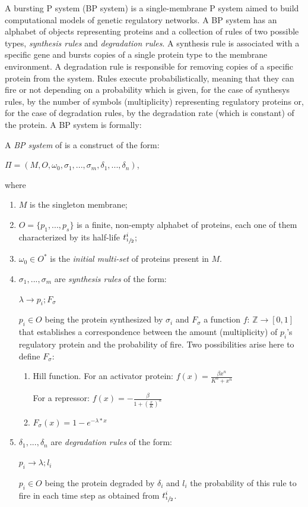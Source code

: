 \documentclass[runningheads,a4paper]{llncs}
\begin{document}
A bursting P system (BP system) is a single-membrane P system aimed to build computational models of genetic regulatory networks. A BP system has an alphabet of objects representing proteins and a collection of rules of two possible types, \emph{synthesis rules} and \emph{degradation rules}. A synthesis rule is associated with a specific gene and bursts copies of a single protein type to the membrane environment. A degradation rule is responsible for removing copies of a specific protein from the system. Rules execute probabilistically, meaning that they can fire or not depending on a probability which is given, for the case of synthesys rules, by the number of symbols (multiplicity) representing regulatory proteins or, for the case of degradation rules, by the degradation rate (which is constant) of the protein. A BP system is formally:

A \emph{BP system} of is a construct of the form:
\begin{center} $\Pi = ( M, O,\omega_{0} ,\sigma_1, ..., \sigma_m, \delta_1, ..., \delta_n)$,\end{center}
where
\begin{enumerate}
\item $M$ is the singleton membrane;
\item $O=\{p_1, ..., p_s \}$ is a finite, non-empty alphabet of proteins, each one of them characterized by its half-life $t^i_{\sfrac{1}{2}}$;
\item $\omega_{0} \in O^*$ is the \emph{initial multi-set} of proteins present in $M$.
\item $\sigma_1, ..., \sigma_m$ are \emph{synthesis rules} of the form:
\begin{center} $\lambda \rightarrow p_i; F_\sigma$\end{center}
$p_i \in O$ being the protein synthesized by $\sigma_i$ and $F_\sigma$ a function $f$: $\mathbb{Z} \rightarrow [0,1]$ that establishes a correspondence between the amount (multiplicity) of $p_i$'s regulatory protein and the probability of fire. Two possibilities arise here to define $F_\sigma$:
\begin{enumerate}
\item Hill function. For an activator protein:
$f(x)=\frac{\beta x^n}{K^n+x^n}$

For a repressor:
$f(x)=-\frac{\beta}{1+(\frac{x}{K})^n}$
\item $F_\sigma(x) = 1-e^{-\lambda*x}$ 
\end{enumerate}
\item $\delta_1, ..., \delta_n$ are \emph{degradation rules} of the form:
\begin{center} $p_i \rightarrow \lambda; l_i$\end{center}
$p_i \in O$ being the protein degraded by $\delta_i$ and $l_i$ the probability of this rule to fire in each time step as obtained from $t^i_{\sfrac{1}{2}}$.
\end{enumerate}
\end{document}
